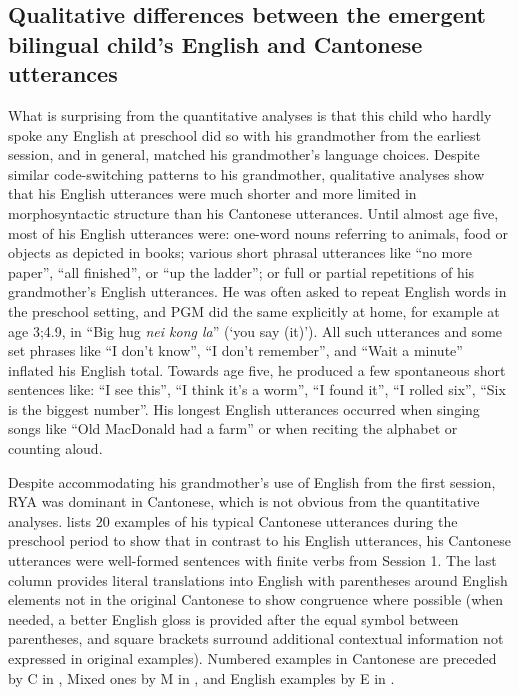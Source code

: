 \documentclass[output=paper,colorlinks,citecolor=brown]{langscibook}
\begin{document}
\subsection{Qualitative differences between the emergent bilingual child’s English and Cantonese utterances}\label{sec:quay:5.2}

What is surprising from the quantitative analyses is that this child who hardly spoke any English at preschool did so with his grandmother from the earliest session, and in general, matched his grandmother’s language choices. Despite similar code-switching patterns to his grandmother, qualitative analyses show that his English utterances were much shorter and more limited in morphosyntactic structure than his Cantonese utterances. Until almost age five, most of his English utterances were: one-word nouns referring to animals, food or objects as depicted in books; various short phrasal utterances like “no more paper”, “all finished”, or “up the ladder”; or full or partial repetitions of his grandmother’s English utterances. He was often asked to repeat English words in the preschool setting, and PGM did the same explicitly at home, for example at age 3;4.9, in “Big hug \textit{nei kong la}” (‘you say (it)’). All such utterances and some set phrases like “I don’t know”, “I don’t remember”, and “Wait a minute” inflated his English total. Towards age five, he produced a few spontaneous short sentences like: “I see this”, “I think it’s a worm”, “I found it”, “I rolled six”, “Six is the biggest number”. His longest English utterances occurred when singing songs like “Old MacDonald had a farm” or when reciting the alphabet or counting aloud.

Despite accommodating his grandmother’s use of English from the first session, RYA was dominant in Cantonese, which is not obvious from the quantitative analyses.  lists 20 examples of his typical Cantonese utterances during the preschool period to show that in contrast to his English utterances, his Cantonese utterances were well-formed sentences with finite verbs from Session 1. The last column provides literal translations into English with parentheses around English elements not in the original Cantonese to show congruence where possible (when needed, a better English gloss is provided after the equal symbol between parentheses, and square brackets surround additional contextual information not expressed in original examples). Numbered examples in Cantonese are preceded by C in , Mixed ones by M in , and English examples by E in .
\end{document}
